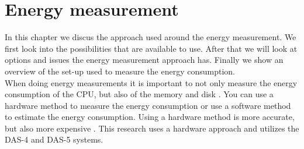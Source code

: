 \chapter{Energy measurement}
\label{ch:energy_measurement}
In this chapter we discus the approach used around the energy measurement. We first look into the possibilities that are available to use. After that we will look at options and issues the energy measurement approach has. Finally we show an overview of the set-up used to measure the energy consumption.\\



When doing energy measurements it is important to not only measure the energy consumption of the CPU, but also of the memory and disk \cite{acar2016impact}. You can use a hardware method to measure the energy consumption or use a software method to estimate the energy consumption. Using a hardware method is more accurate, but also more expensive \cite{acar2016impact}. This research uses a hardware approach and utilizes the DAS-4 and DAS-5 systems. \\

